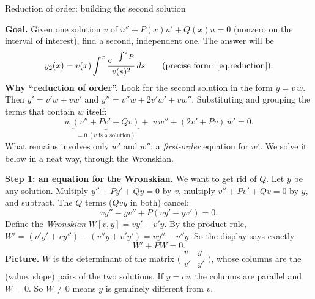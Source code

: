 \documentclass[11pt]{beamer}
\begin{document}
\begin{frame}[allowframebreaks=1.00]{Reduction of order: building the second solution}
\footnotesize

\textbf{Goal.} Given one solution \(v\) of \(u''+P(x)u'+Q(x)u=0\) (nonzero on the interval of interest),
find a second, independent one. The answer will be
\[
 y_2(x)=v(x)\int^x\frac{e^{-\int^sP}}{v(s)^2}\,ds
 \qquad\text{(precise form: \eqref{eq:reduction}).}
\]
\textbf{Why ``reduction of order''.} Look for the second solution in the form \(y=v\,w\). Then
\(y'=v'w+vw'\) and \(y''=v''w+2v'w'+vw''\). Substituting and grouping the terms that contain \(w\) itself:
\[
 w\,\underbrace{(v''+Pv'+Qv)}_{=0\ (v\text{ is a solution})}+\;v\,w''+(2v'+Pv)\,w'=0 .
\]
What remains involves only \(w'\) and \(w''\): a \emph{first-order} equation for \(w'\). We solve it below in
a neat way, through the Wronskian.
\par\framebreak\par
\textbf{Step 1: an equation for the Wronskian.} We want to get rid of \(Q\). Let \(y\) be any solution.
Multiply \(y''+Py'+Qy=0\) by \(v\), multiply \(v''+Pv'+Qv=0\) by \(y\), and subtract. The \(Q\) terms (\(Qvy\)
in both) cancel:
\[
  vy''-yv''+P(vy'-yv')=0.
\]
Define the \emph{Wronskian} \(W[v,y]=vy'-v'y\). By the product rule,
\(W'=(v'y'+vy'')-(v''y+v'y')=vy''-v''y\). So the display says exactly
\begin{equation}
  W'+PW=0.
  \label{eq:abel-w}
\end{equation}
\textbf{Picture.} \(W\) is the determinant of the matrix
\(\bigl(\begin{smallmatrix}v&y\\v'&y'\end{smallmatrix}\bigr)\), whose columns are the (value, slope) pairs of the two
solutions. If \(y=cv\), the columns are parallel and \(W=0\). So \(W\ne0\) means \(y\) is genuinely different
from \(v\).


\end{frame}
\end{document}
